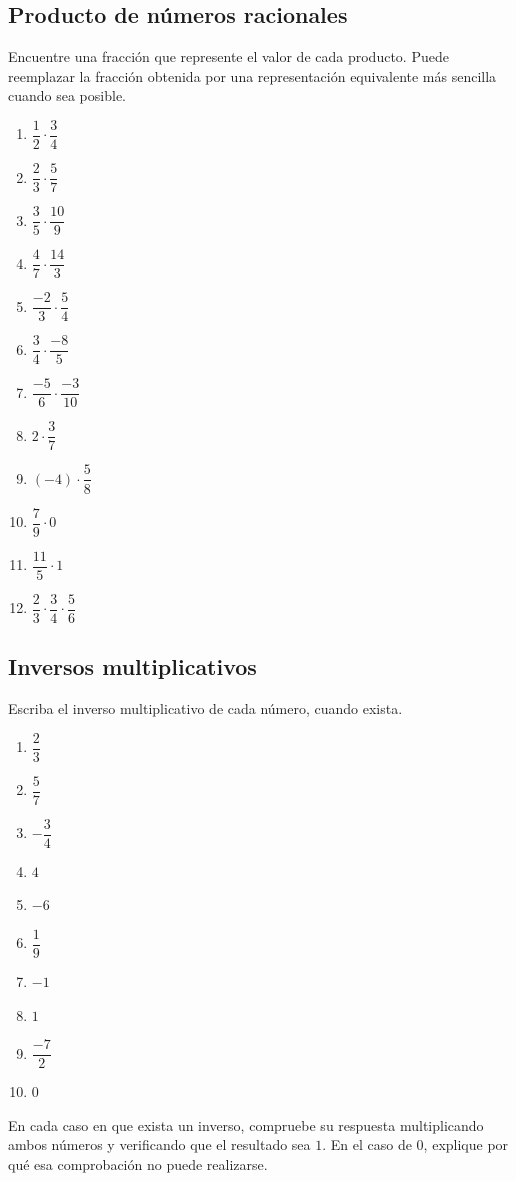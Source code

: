 \subsection*{Producto de números racionales}

Encuentre una fracción que represente el valor de cada producto. Puede reemplazar la fracción obtenida por una representación equivalente más sencilla cuando sea posible.

\begin{enumerate}
\item \(\dfrac12\cdot\dfrac34\)
\item \(\dfrac23\cdot\dfrac57\)
\item \(\dfrac35\cdot\dfrac{10}{9}\)
\item \(\dfrac47\cdot\dfrac{14}{3}\)
\item \(\dfrac{-2}{3}\cdot\dfrac54\)
\item \(\dfrac34\cdot\dfrac{-8}{5}\)
\item \(\dfrac{-5}{6}\cdot\dfrac{-3}{10}\)
\item \(2\cdot\dfrac37\)
\item \((-4)\cdot\dfrac58\)
\item \(\dfrac79\cdot0\)
\item \(\dfrac{11}{5}\cdot1\)
\item \(\dfrac23\cdot\dfrac34\cdot\dfrac56\)
\end{enumerate}

\subsection*{Inversos multiplicativos}

Escriba el inverso multiplicativo de cada número, cuando exista.

\begin{enumerate}
\item \(\dfrac23\)
\item \(\dfrac57\)
\item \(-\dfrac34\)
\item \(4\)
\item \(-6\)
\item \(\dfrac{1}{9}\)
\item \(-1\)
\item \(1\)
\item \(\dfrac{-7}{2}\)
\item \(0\)
\end{enumerate}

En cada caso en que exista un inverso, compruebe su respuesta multiplicando ambos números y verificando que el resultado sea \(1\). En el caso de \(0\), explique por qué esa comprobación no puede realizarse.

